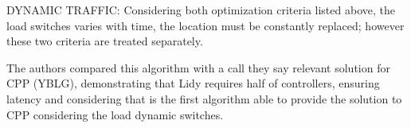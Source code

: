 \documentclass[a4paper,10pt]{article}
\begin{document}
DYNAMIC TRAFFIC: Considering both optimization criteria listed above, the load switches varies with time, the location must be constantly replaced; however these two criteria are treated separately.

The authors compared this algorithm with a call they say relevant solution for CPP (YBLG), demonstrating that Lidy requires half of controllers, ensuring latency and considering that is the first algorithm able to provide the solution to CPP considering the load dynamic switches. 






\end{document}
